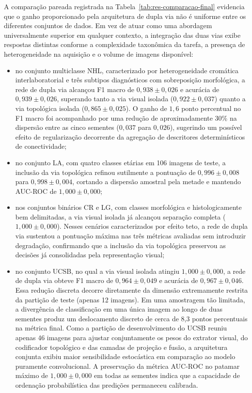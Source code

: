 A comparação pareada registrada na Tabela~\ref{tab:res-comparacao-final} evidencia que o ganho proporcionado pela arquitetura de dupla via não é uniforme entre os diferentes conjuntos de dados. Em vez de atuar como uma abordagem universalmente superior em qualquer contexto, a integração das duas vias exibe respostas distintas conforme a complexidade taxonômica da tarefa, a presença de heterogeneidade na aquisição e o volume de imagens disponível:
\begin{itemize}
    \item no conjunto multiclasse NHL, caracterizado por heterogeneidade cromática interlaboratorial e três subtipos diagnósticos com sobreposição morfológica, a rede de dupla via alcançou F1 macro de $0{,}938 \pm 0{,}026$ e acurácia de $0{,}939 \pm 0{,}026$, superando tanto a via visual isolada ($0{,}922 \pm 0{,}037$) quanto a via topológica isolada ($0{,}865 \pm 0{,}025$). O ganho de $1{,}6$ ponto percentual no F1 macro foi acompanhado por uma redução de aproximadamente 30\% na dispersão entre as cinco sementes ($0{,}037$ para $0{,}026$), sugerindo um possível efeito de regularização decorrente da agregação de descritores determinísticos de conectividade;
    \item no conjunto LA, com quatro classes etárias em 106 imagens de teste, a inclusão da via topológica refinou sutilmente a pontuação de $0{,}996 \pm 0{,}008$ para $0{,}998 \pm 0{,}004$, cortando a dispersão amostral pela metade e mantendo AUC-ROC de $1{,}000 \pm 0{,}000$;
    \item nos conjuntos binários CR e LG, com classes morfológica e histologicamente bem delimitadas, a via visual isolada já alcançou separação completa ($1{,}000 \pm 0{,}000$). Nesses cenários caracterizados por efeito teto, a rede de dupla via sustentou a pontuação máxima nas três métricas avaliadas sem introduzir degradação, confirmando que a inclusão da via topológica preservou as decisões já consolidadas pela representação visual;
    \item no conjunto UCSB, no qual a via visual isolada atingiu $1{,}000 \pm 0{,}000$, a rede de dupla via obteve F1 macro de $0{,}964 \pm 0{,}049$ e acurácia de $0{,}967 \pm 0{,}046$. Essa redução discreta decorre diretamente da dimensão extremamente restrita da partição de teste (apenas 12 imagens). Em uma amostragem tão limitada, a divergência de classificação em uma única imagem ao longo de duas sementes produz um deslocamento discreto de cerca de 8,3 pontos percentuais na métrica final. Como a partição de desenvolvimento do UCSB reuniu apenas 46 imagens para ajustar conjuntamente os pesos do extrator visual, do codificador topológico e das camadas de projeção e fusão, a arquitetura conjunta exibiu maior sensibilidade estocástica em comparação ao modelo puramente convolucional. A preservação da métrica AUC-ROC no patamar máximo de $1{,}000 \pm 0{,}000$ em todas as sementes indica que a capacidade de ordenação probabilística das predições permaneceu calibrada.
\end{itemize}
